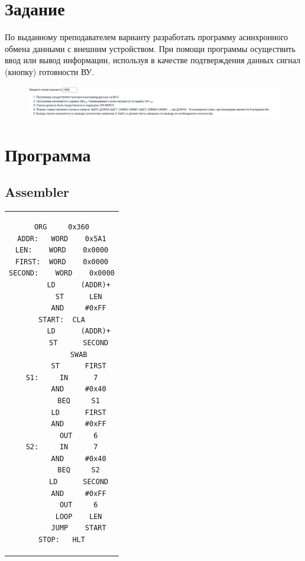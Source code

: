 

\section{Задание}
По выданному преподавателем варианту разработать программу асинхронного обмена данными с внешним устройством. При помощи
программы осуществить ввод или вывод информации, используя в качестве подтверждения данных сигнал (кнопку) готовности ВУ.


\begin{figure}[H]
    \centering
    \includegraphics[scale=0.35]{img/variant}
\end{figure}


\section{Программа}

\subsection{Assembler}

\begin{center}
    \begin{tabular}{c}
        \begin{lstlisting}[basicstyle=\ttfamily]
        ORG     0x360
ADDR:	WORD	0x5A1
LEN:	WORD	0x0000
FIRST:	WORD	0x0000
SECOND:    WORD    0x0000
        LD      (ADDR)+
        ST      LEN
        AND     #0xFF
START:	CLA
        LD      (ADDR)+
        ST      SECOND
        SWAB
        ST      FIRST
S1:     IN      7
        AND     #0x40
        BEQ     S1
        LD      FIRST
        AND     #0xFF
        OUT     6
S2:     IN      7
        AND     #0x40
        BEQ     S2
        LD      SECOND
        AND     #0xFF
        OUT     6
        LOOP    LEN
        JUMP    START
STOP:	HLT

        \end{lstlisting}
    \end{tabular}
\end{center}

\newpage

